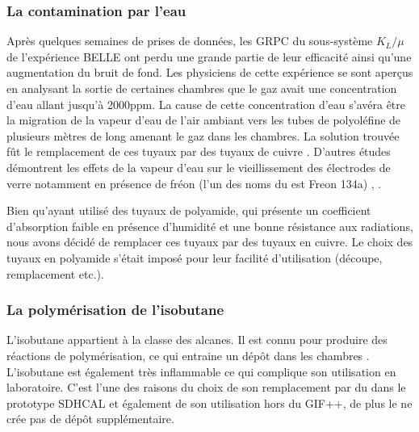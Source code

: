 \subsubsection{La contamination par l'eau}
Après quelques semaines de prises de données, les GRPC du sous-système $K_{L}/\mu$ de l'expérience BELLE ont perdu une grande partie de leur efficacité ainsi qu'une augmentation du bruit de fond. Les physiciens de cette expérience se sont aperçus en analysant la sortie de certaines chambres que le gaz avait une concentration d'eau allant jusqu'à \num{2000}ppm. La cause de cette concentration d'eau s'avéra être la migration de la vapeur d'eau de l'air ambiant  vers les tubes de polyoléfine de plusieurs mètres de long amenant le gaz dans les chambres. La solution trouvée fût le remplacement de ces tuyaux par des tuyaux de cuivre \cite{Abashian:2000vb}. D'autres études démontrent les effets de la vapeur d'eau sur le vieillissement des électrodes de verre notamment en présence de fréon (l'un des noms du  est Freon 134a) \cite{Sakai:772080}, \cite{Kubo:2002jq}.

\newpage
Bien qu'ayant utilisé des tuyaux de polyamide, qui présente un coefficient d'absorption faible en présence d'humidité et une bonne résistance aux radiations, nous avons décidé de remplacer ces tuyaux par des tuyaux en cuivre. Le choix des tuyaux en polyamide s'était imposé pour leur facilité d'utilisation (découpe, remplacement etc.). 

\subsubsection{La polymérisation de l'isobutane}
 L'isobutane  appartient à la classe des alcanes. Il est connu pour produire des réactions de polymérisation, ce qui entraine un dépôt dans les chambres \cite{na60}. L'isobutane est également très inflammable ce qui complique son utilisation en laboratoire. C'est l'une des raisons du choix de son remplacement par du  dans le prototype SDHCAL et également de son utilisation hors du GIF++, de plus le  ne crée pas de dépôt supplémentaire.


